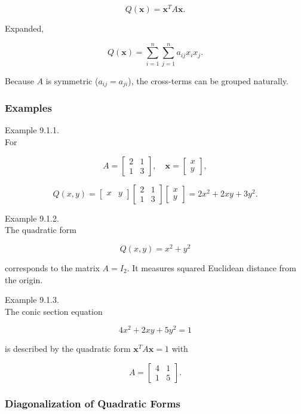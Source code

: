 \documentclass[
  12pt,
  a4paper,
]{article}
\begin{document}
\[Q(\mathbf{x}) = \mathbf{x}^T A \mathbf{x}.\]

Expanded,

\[Q(\mathbf{x}) = \sum_{i=1}^n \sum_{j=1}^n a_{ij} x_i x_j.\]

Because \(A\) is symmetric (\(a_{ij} = a_{ji}\)), the cross-terms can be
grouped naturally.

\subsubsection{Examples}\label{examples-9}

Example 9.1.1.\\
For

\[A = \begin{bmatrix} 2 & 1 \\ 1 & 3 \end{bmatrix}, \quad \mathbf{x} = \begin{bmatrix} x \\ y \end{bmatrix},\]

\[Q(x,y) = \begin{bmatrix} x & y \end{bmatrix} 
\begin{bmatrix} 2 & 1 \\ 1 & 3 \end{bmatrix} 
\begin{bmatrix} x \\ y \end{bmatrix}
= 2x^2 + 2xy + 3y^2.\]

Example 9.1.2.\\
The quadratic form

\[Q(x,y) = x^2 + y^2\]

corresponds to the matrix \(A = I_2\). It measures squared Euclidean
distance from the origin.

Example 9.1.3.\\
The conic section equation

\[4x^2 + 2xy + 5y^2 = 1\]

is described by the quadratic form \(\mathbf{x}^T A \mathbf{x} = 1\)
with

\[A = \begin{bmatrix} 4 & 1 \\ 1 & 5 \end{bmatrix}.\]

\subsubsection{Diagonalization of Quadratic
Forms}\label{diagonalization-of-quadratic-forms}
\end{document}
